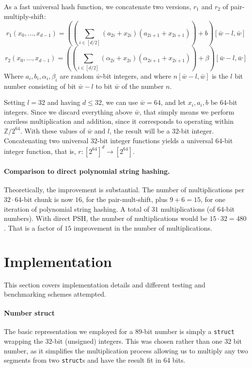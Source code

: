 \documentclass[]{article}
\newcommand{\funk}[1]{\small\texttt{#1}}
\begin{document}
As a fast universal hash function, we concatenate two versions, $r_1$ and $r_2$ of pair-multiply-shift:
\[r_1(x_0,\ldots ,x_{d-1}) = \left(\left(\sum_{i\in [d/2]}(a_{2i} + x_{2i})(a_{2i+1} + x_{2i+1}) \right)+b \right) [\bar{w}-l,\bar{w}]\]
\[r_2(x_0,\ldots ,x_{d-1}) = \left(\left(\sum_{i\in [d/2]}(\alpha_{2i} + x_{2i})(\alpha_{2i+1} + x_{2i+1}) \right)+\beta \right) [\bar{w}-l,\bar{w}]\]
Where $a_i,b_i,\alpha_i,\beta_i$ are random $\bar{w}$-bit integers, and where $n[\bar{w}-l,\bar{w}]$ is the $l$ bit number consisting of bit $\bar{w}-l$ to bit $\bar{w}$ of the number $n$.

Setting $l = 32$ and having $d\leq 32$, we can use $\bar{w} = 64$, and let $x_i,a_i,b$ be $64$-bit integers. Since we discard everything above $\bar{w}$, that simply means we perform carriless multiplication and addition, since it corresponds to operating within $\mathbb{Z}/2^{64}$. With these values of $\bar{w}$ and $l$, the result will be a $32$-bit integer. Concatenating two universal $32$-bit integer functions yields a universal $64$-bit integer function, that is, $r: [2^{64}]^d \to [2^{64}]$.

\paragraph{Comparison to direct polynomial string hashing.} Theoretically, the improvement is substantial. The number of multiplications per $32\cdot 64$-bit chunk is now $16$, for the pair-mult-shift, plus $9+6=15$, for one iteration of polynomial string hashing. A total of $31$ multiplications (of $64$-bit numbers). With direct PSH, the number of multiplications would be $15\cdot 32 = 480$. That is a factor of $15$ improvement in the number of multiplications.

\section{Implementation}

This section covers implementation details and different testing and benchmarking schemes attempted.

\paragraph{Number struct}

The basic representation we employed for a 89-bit number is simply a \funk{struct} wrapping the 32-bit (unsigned) integers. This was chosen rather than one 32 bit number, as it simplifies the multiplication process allowing us to multiply any two segments from two \funk{struct}s and have the result fit in 64 bits.
\end{document}

